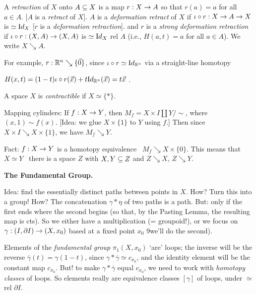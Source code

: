 \documentclass[12pt]{article}
\begin{document}
\msk

A {\it retraction} of $X$ onto $A\subseteq X$ is a map $r:X\rightarrow A$ so that $r(a)=a$
for all $a\in A$. [$A$ is a {\it retract} of $X$]. $A$ is a {\it deformation
retract} of $X$ if $\iota\circ r:X\rightarrow A\rightarrow X$ is $\simeq{\textrm Id}_X$
[$r$ is a {\it deformation retraction}]. and $r$ is a {\it strong
deformation retraction} if $\iota\circ r:(X,A)\rightarrow (X,A)$ is $\simeq{\textrm Id}_X$
rel $A$ (i.e., $H(a,t)=a$ for all $a\in A$). We write $X\searrow A$. 

\ssk

For example, $r:{\mathbb R}^n\searrow\{\vec{0}\}$, since $\iota\circ r\simeq{\textrm Id}_{{\mathbb R}^n}$
via a straight-line homotopy 

\hfill $H(x,t)=(1-t)\iota\circ r(\vec{x})+t{\textrm Id}_{{\mathbb R}^n}(\vec{x})=t\vec{x}$ .

\ssk

A space $X$ is {\it contractible} if $X\simeq\{*\}$.

\ssk

Mapping cylinders:  If $f:X\rightarrow Y$, then $M_f = X\times I\coprod Y/\sim$, where
$(x,1)\sim f(x)$. [Idea: we glue $X\times\{1\}$ to $Y$ using $f$.] Then since 
$X\times I\searrow X\times\{1\}$, we have $M_f\searrow Y$.

\ssk

Fact: $f:X\rightarrow Y$ is a homotopy equivalence \lra\ $M_f\searrow X\times\{0\}$.
This means that $X\simeq Y$ \lra\ there is a space $Z$ with $X,Y\subseteq Z$ and 
$Z\searrow X$, $Z\searrow Y$.

\msk

{\bf The Fundamental Group.}

\ssk

Idea: find the essentially distinct paths between points in $X$.
How? Turn this into a group! How? The concatenation $\gamma*\eta$ of two paths is
a path. But: only if the first ends where the second begins (so that, by
the Pasting Lemma, the resulting map is cts). So we
either have a  multiplication (= groupoid!), or we
focus on  $\gamma:(I,\partial I)\rightarrow (X,x_0)$ based at a
fixed point $x_0$ 9we'll do the second).

\ssk

Elements of the {\it fundamental group} $\pi_1(X,x_0)$ `are' 
loops; the inverse will be the reverse $\overline{\gamma}(t)=\gamma(1-t)$,
since $\gamma*\overline{\gamma}\simeq c_{x_0}$, and the 
identity element will be the constant map $c_{x_0}$.
But! to make $\gamma*\overline{\gamma}$ equal $c_{x_0}$, we need to work with
{\it homotopy classes} of loops. So elements really are 
equivalence classes $[\gamma]$ of loops, under $\simeq$ rel $\partial I$.
\end{document}
